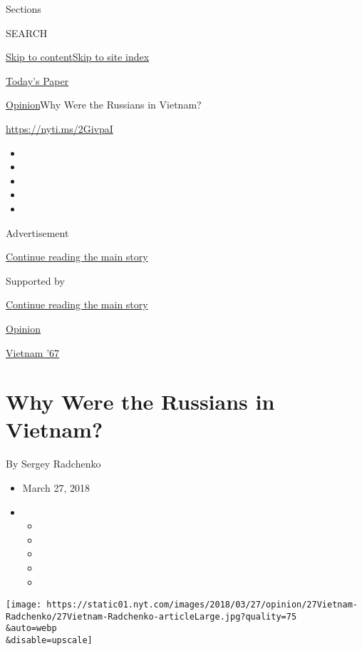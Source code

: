 Sections

SEARCH

\protect\hyperlink{site-content}{Skip to
content}\protect\hyperlink{site-index}{Skip to site index}

\href{https://myaccount.nytimes.com/auth/login?response_type=cookie\&client_id=vi}{}

\href{https://www.nytimes.com/section/todayspaper}{Today's Paper}

\href{/section/opinion}{Opinion}\textbar{}Why Were the Russians in
Vietnam?

\href{https://nyti.ms/2GivpaI}{https://nyti.ms/2GivpaI}

\begin{itemize}
\item
\item
\item
\item
\item
\end{itemize}

Advertisement

\protect\hyperlink{after-top}{Continue reading the main story}

Supported by

\protect\hyperlink{after-sponsor}{Continue reading the main story}

\href{/section/opinion}{Opinion}

\href{/column/vietnam-67}{Vietnam '67}

\hypertarget{why-were-the-russians-in-vietnam}{%
\section{Why Were the Russians in
Vietnam?}\label{why-were-the-russians-in-vietnam}}

By Sergey Radchenko

\begin{itemize}
\item
  March 27, 2018
\item
  \begin{itemize}
  \item
  \item
  \item
  \item
  \item
  \end{itemize}
\end{itemize}

\texttt{[image: https://static01.nyt.com/images/2018/03/27/opinion/27Vietnam-Radchenko/27Vietnam-Radchenko-articleLarge.jpg?quality=75\\\&auto=webp\\\&disable=upscale]}

